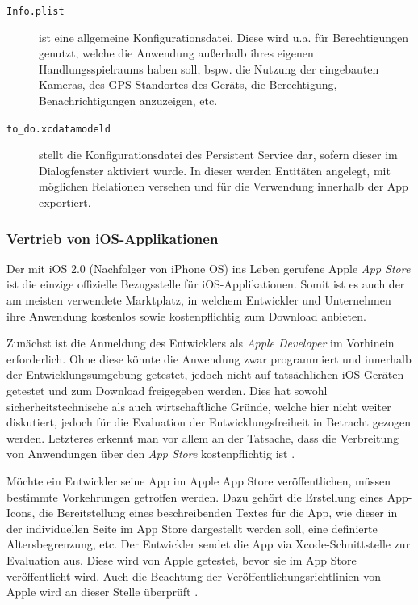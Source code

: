 \begin{description}
	\item[\texttt{Info.plist}] ist eine allgemeine Konfigurationsdatei. Diese wird u.a. für Berechtigungen genutzt, welche die Anwendung außerhalb ihres eigenen Handlungsspielraums haben soll, bspw. die Nutzung der eingebauten Kameras, des GPS-Standortes des Geräts, die Berechtigung, Benachrichtigungen anzuzeigen, etc.
	\item[\texttt{to\_do.xcdatamodeld}] stellt die Konfigurationsdatei des Persistent Service dar, sofern dieser im Dialogfenster aktiviert wurde. In dieser werden Entitäten angelegt, mit möglichen Relationen versehen und für die Verwendung innerhalb der App exportiert.
\end{description}

\subsubsection{Vertrieb von iOS-Applikationen} \label{subsubsec:publish-ios}
Der mit iOS 2.0 (Nachfolger von iPhone OS) ins Leben gerufene Apple \textit{App Store} ist die einzige offizielle Bezugsstelle für iOS-Applikationen. Somit ist es auch der am meisten verwendete Marktplatz, in welchem Entwickler und Unternehmen ihre Anwendung kostenlos sowie kostenpflichtig zum Download anbieten.

Zunächst ist die Anmeldung des Entwicklers als \textit{Apple Developer} im Vorhinein erforderlich. Ohne diese könnte die Anwendung zwar programmiert und innerhalb der Entwicklungsumgebung getestet, jedoch nicht auf tatsächlichen iOS-Geräten getestet und zum Download freigegeben werden. Dies hat sowohl sicherheitstechnische als auch wirtschaftliche Gründe, welche hier nicht weiter diskutiert, jedoch für die Evaluation der Entwicklungsfreiheit in Betracht gezogen werden. Letzteres erkennt man vor allem an der Tatsache, dass die Verbreitung von Anwendungen über den \textit{App Store} kostenpflichtig ist \cite{ApplePublish}.

Möchte ein Entwickler seine App im Apple App Store veröffentlichen, müssen bestimmte Vorkehrungen getroffen werden. Dazu gehört die Erstellung eines App-Icons, die Bereitstellung eines beschreibenden Textes für die App, wie dieser in der individuellen Seite im App Store dargestellt werden soll, eine definierte Altersbegrenzung, etc. Der Entwickler sendet die App via Xcode-Schnittstelle zur Evaluation aus. Diese wird von Apple getestet, bevor sie im App Store veröffentlicht wird. Auch die Beachtung der Veröffentlichungsrichtlinien von Apple wird an dieser Stelle überprüft \cite{ApplePublish}.

